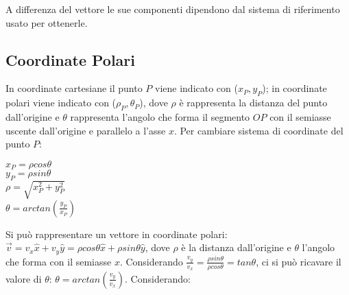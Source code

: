 \documentclass{article}
\numberwithin{equation}{subsection}
\begin{document}
A differenza del vettore le sue componenti dipendono dal sistema di riferimento usato per ottenerle.

\subsection{Coordinate Polari}
In coordinate cartesiane il punto $P$ viene indicato con ($x_P, y_P$); in coordinate polari viene indicato con ($\rho_P, \theta_P$), dove 
$\rho$ è rappresenta la distanza del punto dall'origine e $\theta$ rappresenta l'angolo che forma il segmento $OP$ con il semiasse uscente dall'origine e parallelo a l'asse $x$.
Per cambiare sistema di coordinate del punto $P$: 

\begin{center}
\(x_P = \rho cos\theta\)\\
\(y_P = \rho sin\theta\)\\
\(\rho = \displaystyle\sqrt{x_P^{2} + y_P^{2}}\)\\
\(\theta = arctan\left(\displaystyle\frac{y_P}{x_P}\right)\)
\end{center}

\begin{center}\end{center}

Si può rappresentare un vettore in coordinate polari: $\vec{v} = v_x\hat{x} + v_y\hat{y} = \rho cos\theta\hat{x} + \rho sin\theta\hat{y}$, dove $\rho$ è la distanza dall'origine e $\theta$ l'angolo che forma con il semiasse $x$.
Considerando $\displaystyle\frac{v_y}{v_x} = \displaystyle\frac{\rho sin\theta}{\rho cos\theta} = tan\theta$, ci si può ricavare il valore di $\theta$: $\theta = arctan\displaystyle\left(\frac{v_y}{v_x}\right)$.
Considerando: 
\end{document}
